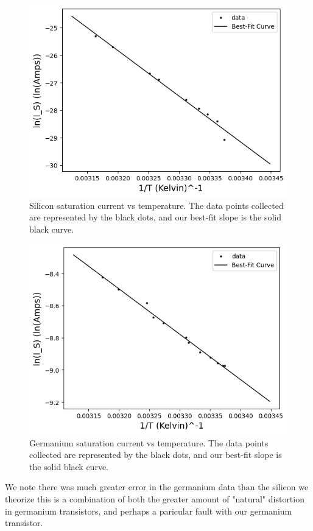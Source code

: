 \documentclass[12pt,letterpaper,twocolumn]{article}
\begin{document}
\begin{figure}[h]
	\includegraphics[width = .5\textwidth]{linSiSatCurrent.png}
	\caption{Silicon saturation current vs temperature. The data points collected are represented by the black dots, and our best-fit slope is the solid black curve.\label{g3}}
\end{figure}
\begin{figure}[h]
	\includegraphics[width = .5\textwidth]{linGeSatCurrent.png}
	\caption{Germanium saturation current vs temperature. The data points collected are represented by the black dots, and our best-fit slope is the solid black curve.\label{g4}}
\end{figure}
We note there was much greater error in the germanium data than the silicon we theorize this is a combination of both the greater amount of "natural" distortion in germanium transistors, and perhaps a paricular fault with our germanium transistor.
\end{document}

